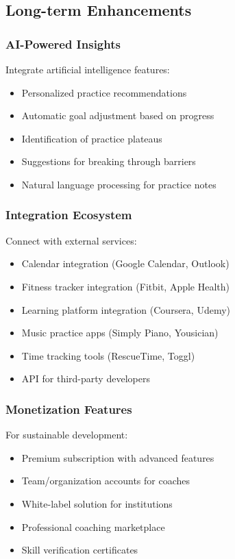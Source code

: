 \documentclass[12pt,a4paper]{report}
\newcommand{\JustifiedNormal}{\fontsize{12}{14}\selectfont\justifying\setlength{\parindent}{0pt}}
\begin{document}
\subsection{Long-term Enhancements}
\JustifiedNormal

\subsubsection{AI-Powered Insights}
\JustifiedNormal
Integrate artificial intelligence features:
\begin{itemize}
  \item Personalized practice recommendations
  \item Automatic goal adjustment based on progress
  \item Identification of practice plateaus
  \item Suggestions for breaking through barriers
  \item Natural language processing for practice notes
\end{itemize}

\subsubsection{Integration Ecosystem}
\JustifiedNormal
Connect with external services:
\begin{itemize}
  \item Calendar integration (Google Calendar, Outlook)
  \item Fitness tracker integration (Fitbit, Apple Health)
  \item Learning platform integration (Coursera, Udemy)
  \item Music practice apps (Simply Piano, Yousician)
  \item Time tracking tools (RescueTime, Toggl)
  \item API for third-party developers
\end{itemize}

\subsubsection{Monetization Features}
\JustifiedNormal
For sustainable development:
\begin{itemize}
  \item Premium subscription with advanced features
  \item Team/organization accounts for coaches
  \item White-label solution for institutions
  \item Professional coaching marketplace
  \item Skill verification certificates
\end{itemize}
\end{document}
